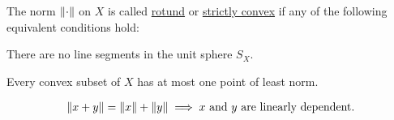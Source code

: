 \begin{definition}\label{def:rotund_norm}\cite[Definition 2.36]{Phelps1993}
  The norm $\left\Vert \cdot \right\Vert$ on $X$ is called \uline{rotund} or \uline{strictly convex} if any of the following equivalent conditions hold:
  \begin{defenum}
    \item\label{def:rotund_norm/no_sphere_segments} There are no line segments in the unit sphere $S_X$.
    \item\label{def:rotund_norm/least_norm} Every convex subset of $X$ has at most one point of least norm.
    \item\label{def:rotund_norm/linearly_dependent}
    \begin{align}\label{def:rotund_norm/linearly_dependent/equation}
      \left\Vert x + y \right\Vert = \left\Vert x \right\Vert + \left\Vert y \right\Vert \implies x \text{ and } y \text{ are linearly dependent}.
    \end{align}
  \end{defenum}
\end{definition}
